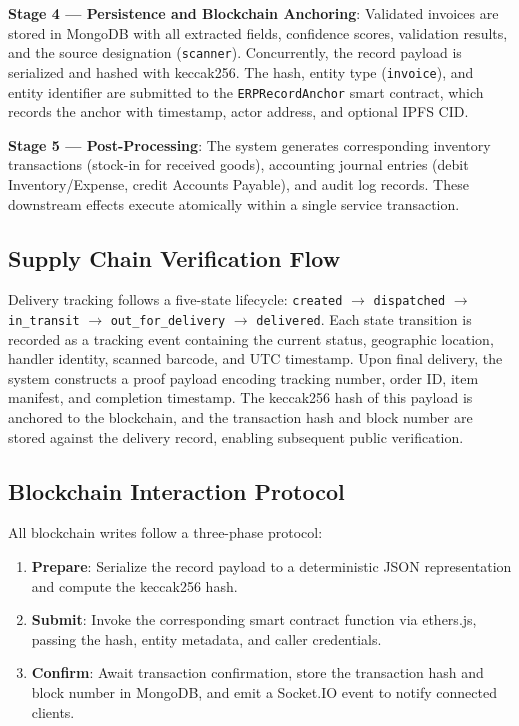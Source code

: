 \documentclass[conference]{IEEEtran}
\begin{document}
\textbf{Stage 4 — Persistence and Blockchain Anchoring}: Validated invoices are stored in MongoDB with all extracted fields, confidence scores, validation results, and the source designation (\texttt{scanner}). Concurrently, the record payload is serialized and hashed with keccak256. The hash, entity type (\texttt{invoice}), and entity identifier are submitted to the \texttt{ERPRecordAnchor} smart contract, which records the anchor with timestamp, actor address, and optional IPFS CID.

\textbf{Stage 5 — Post-Processing}: The system generates corresponding inventory transactions (stock-in for received goods), accounting journal entries (debit Inventory/Expense, credit Accounts Payable), and audit log records. These downstream effects execute atomically within a single service transaction.

\subsection{Supply Chain Verification Flow}
Delivery tracking follows a five-state lifecycle: \texttt{created} $\rightarrow$ \texttt{dispatched} $\rightarrow$ \texttt{in\_transit} $\rightarrow$ \texttt{out\_for\_delivery} $\rightarrow$ \texttt{delivered}. Each state transition is recorded as a tracking event containing the current status, geographic location, handler identity, scanned barcode, and UTC timestamp. Upon final delivery, the system constructs a proof payload encoding tracking number, order ID, item manifest, and completion timestamp. The keccak256 hash of this payload is anchored to the blockchain, and the transaction hash and block number are stored against the delivery record, enabling subsequent public verification.

\subsection{Blockchain Interaction Protocol}
All blockchain writes follow a three-phase protocol:
\begin{enumerate}
    \item \textbf{Prepare}: Serialize the record payload to a deterministic JSON representation and compute the keccak256 hash.
    \item \textbf{Submit}: Invoke the corresponding smart contract function via ethers.js, passing the hash, entity metadata, and caller credentials.
    \item \textbf{Confirm}: Await transaction confirmation, store the transaction hash and block number in MongoDB, and emit a Socket.IO event to notify connected clients.
\end{enumerate}
\end{document}
